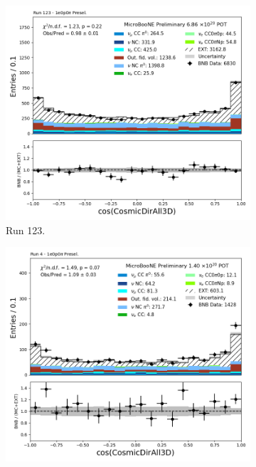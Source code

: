 \begin{figure}[H]
    \centering
    \begin{subfigure}[t]{0.32\linewidth}
        \includegraphics[width=\linewidth]{technote/Appendix_Preselection/Figures/1e0p0pi/Run123/CosmicDirAll3D_Run123_1e0p0pi_Presel.png}
        \caption{Run 123.}
    \end{subfigure}%
    \hspace{0.2cm}%
    \begin{subfigure}[t]{0.32\linewidth}
        \includegraphics[width=\linewidth]{technote/Appendix_Preselection/Figures/1e0p0pi/Run4b/CosmicDirAll3D_Run4b_1e0p0pi_Presel.png}

\end{subfigure}
\end{figure}
